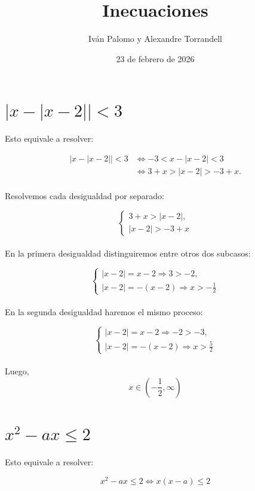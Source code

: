 \documentclass{article}
\title{Inecuaciones}
\author{Iván Palomo y Alexandre Torrandell}
\date{23 de febrero de 2026}
\begin{document}
	\maketitle
	\tableofcontents
	\newpage
	
	\section{$|x-|x-2||<3$}
		
	\medskip
	
	Esto equivale a resolver:
	
	\begin{align*}
		|x-|x-2||<3
		&\iff -3<x-|x-2|<3\\
		&\iff 3+x > |x-2|> -3 + x. \\
	\end{align*}
	
	
	Resolvemos cada desigualdad por separado:
	
	$$
	\begin{cases}
		3+x > |x-2|,\\
		|x-2|> -3 + x
	\end{cases}
	$$ \\
	
	En la primera desigualdad distinguiremos entre otros dos subcasos:
	
		$$
	\begin{cases}
		|x-2| = x-2 \Rightarrow 3 > -2,\\
		|x-2| = -(x-2) \Rightarrow x > -\frac{1}{2}
	\end{cases}
	$$ \\
	
	En la segunda desigualdad haremos el mismo proceso:
	
		$$
	\begin{cases}
		|x-2| = x-2 \Rightarrow -2 > -3,\\
		|x-2| = -(x-2) \Rightarrow x >\frac{5}{2}
	\end{cases}
	$$ \\

	Luego,
	$$
	\boxed{ x\in(-\frac{1}{2}, \infty)}
	$$
	
	\section{$x^2 -ax \le 2$}
	
Esto equivale a resolver:
	
		$$x^2 -ax \le 2 \iff x(x-a)\le 2$$ \\
		
\end{document}
